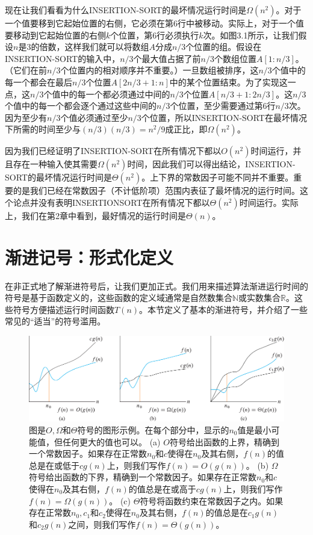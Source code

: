 \documentclass[lang=cn,newtx,10pt,scheme=chinese]{elegantbook}
\begin{document}
现在让我们看看为什么INSERTION-SORT的最坏情况运行时间是$\Omega\left(n^2\right)$。对于一个值要移到它起始位置的右侧，它必须在第6行中被移动。实际上，对于一个值要移动到它起始位置的右侧$k$个位置，第6行必须执行$k$次。如图3.1所示，让我们假设$n$是3的倍数，这样我们就可以将数组$A$分成$n/3$个位置的组。假设在INSERTION-SORT的输入中，$n/3$个最大值占据了前$n/3$个数组位置$A[1:n/3]$。（它们在前$n/3$个位置内的相对顺序并不重要。）一旦数组被排序，这$n/3$个值中的每一个都会在最后$n/3$个位置$A[2n/3+1:n]$中的某个位置结束。为了实现这一点，这$n/3$个值中的每一个都必须通过中间的$n/3$个位置$A[n/3+1:2n/3]$。这$n/3$个值中的每一个都会逐个通过这些中间的$n/3$个位置，至少需要通过第6行$n/3$次。因为至少有$n/3$个值必须通过至少$n/3$个位置，所以INSERTION-SORT在最坏情况下所需的时间至少与$(n/3)(n/3)=n^2/9$成正比，即$\Omega\left(n^2\right)$。

因为我们已经证明了INSERTION-SORT在所有情况下都以$O\left(n^2\right)$时间运行，并且存在一种输入使其需要$\Omega\left(n^2\right)$时间，因此我们可以得出结论，INSERTION-SORT的最坏情况运行时间是$\Theta\left(n^2\right)$。上下界的常数因子可能不同并不重要。重要的是我们已经在常数因子（不计低阶项）范围内表征了最坏情况的运行时间。这个论点并没有表明INSERTIONSORT在所有情况下都以$\Theta\left(n^2\right)$时间运行。实际上，我们在第2章中看到，最好情况的运行时间是$\Theta(n)$。

\section{渐进记号：形式化定义}

在非正式地了解渐进符号后，让我们更加正式。我们用来描述算法渐进运行时间的符号是基于函数定义的，这些函数的定义域通常是自然数集合$\mathbb{N}$或实数集合$\mathbb{R}$。这些符号方便描述运行时间函数$T(n)$。本节定义了基本的渐进符号，并介绍了一些常见的“适当”的符号滥用。

\begin{figure}
    \centering
    \includegraphics{算法导论第四版插图/第二章/渐进时间复杂度比较示意图.pdf}
    \caption{图是$O, \Omega$和$\Theta$符号的图形示例。在每个部分中，显示的$n_0$值是最小可能值，但任何更大的值也可以。 (a) $O$符号给出函数的上界，精确到一个常数因子。如果存在正常数$n_0$和$c$使得在$n_0$及其右侧，$f(n)$的值总是在或低于$cg(n)$上，则我们写作$f(n)=O(g(n))$。 (b) $\Omega$符号给出函数的下界，精确到一个常数因子。如果存在正常数$n_0$和$c$使得在$n_0$及其右侧，$f(n)$的值总是在或高于$cg(n)$上，则我们写作$f(n)=\Omega(g(n))$。 (c) $\Theta$符号将函数约束在常数因子之内。如果存在正常数$n_0,c_1$和$c_2$使得在$n_0$及其右侧，$f(n)$的值总是在$c_1g(n)$和$c_2g(n)$之间，则我们写作$f(n)=\Theta(g(n))$。}
    \label{渐进时间复杂度比较示意图}
\end{figure}
\end{document}
